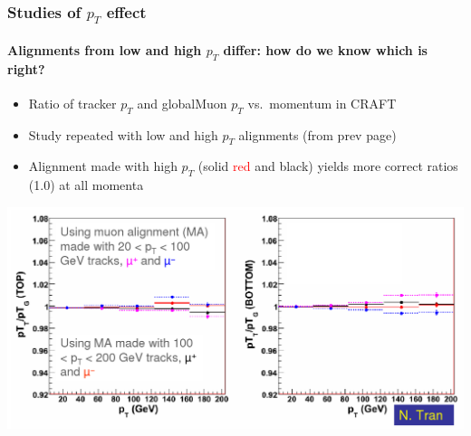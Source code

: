 \documentclass[compress]{beamer}
\begin{document}
\begin{frame}
\frametitle{Studies of $p_T$ effect}
\framesubtitle{Alignments from low and high $p_T$ differ: how do we know which is right?}

\begin{itemize}
\item Ratio of tracker $p_T$ and globalMuon $p_T$ vs.\ momentum in CRAFT
\item Study repeated with low and high $p_T$ alignments {\scriptsize (from prev page)}
\item Alignment made with high $p_T$ (solid \textcolor{red}{red} and black) yields more correct ratios (1.0) at all momenta
\end{itemize}

\vfill\includegraphics[width=\linewidth]{cosmicsplitting_nhan.png}
\end{frame}
\end{document}
